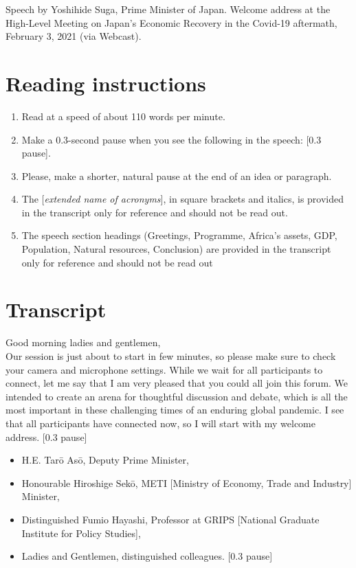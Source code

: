 Speech by Yoshihide Suga, Prime Minister of Japan. Welcome address at the High-Level Meeting on Japan’s Economic Recovery in the Covid-19 aftermath, February 3, 2021 (via Webcast).

\section{Reading instructions} 

\begin{enumerate}
    \item Read at a speed of about 110 words per minute. 
    \item Make a 0.3-second pause when you see the following in the speech: [0.3 pause]. 
    \item Please, make a shorter, natural pause at the end of an idea or paragraph. 
    \item The [\textit{extended name of acronyms}], in square brackets and italics, is provided in the transcript only for reference and should not be read out. 
    \item The speech section headings (Greetings, Programme, Africa’s assets, GDP, Population, Natural resources, Conclusion) are provided in the transcript only for reference and should not be read out
\end{enumerate}

\section{Transcript}

\noindent Good morning ladies and gentlemen, \\
\noindent Our session is just about to start in few minutes, so please make sure to check your camera and microphone settings. While we wait for all participants to connect, let me say that I am very pleased that you could all join this forum. We intended to create an arena for thoughtful discussion and debate, which is all the most important in these challenging times of an enduring global pandemic. I see that all participants have connected now, so I will start with my welcome address. [0.3 pause] \\

\begin{itemize}
    \item H.E. Tarō Asō, Deputy Prime Minister, 
    \item Honourable Hiroshige Sekō, METI [Ministry of Economy, Trade and Industry] Minister, 
    \item Distinguished Fumio Hayashi, Professor at GRIPS [National Graduate Institute for Policy Studies], 
    \item Ladies and Gentlemen, distinguished colleagues. [0.3 pause] 
\end{itemize}

